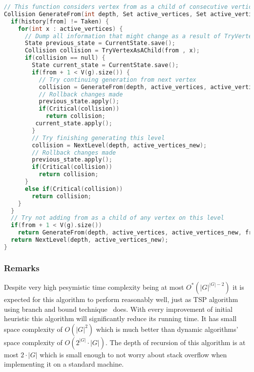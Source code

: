 \begin{lstlisting}[language=C++]
// This function considers vertex from as a child of consecutive vertices from active_vertices. At the time of calling this function, every vertex v < from has been considered on this level.
Collision GenerateFrom(int depth, Set active_vertices, Set active_vertices_new, int from) {
  if(history[from] != Taken) {
    for(int x : active_vertices) {
      // Dump all information that might change as a result of TryVertexAsAChild
      State previous_state = CurrentState.save();
      Collision collision = TryVertexAsAChild(from , x);
      if(collision == null) {
        State current_state = CurrentState.save();
        if(from + 1 < V(g).size()) {
          // Try continuing generation from next vertex
          collision = GenerateFrom(depth, active_vertices, active_vertices_new, from + 1);
          // Rollback changes made
          previous_state.apply();
          if(Critical(collision))
            return collision;
         current_state.apply();
        }
        // Try finishing generating this level
        collision = NextLevel(depth, active_vertices_new);
        // Rollback changes made
        previous_state.apply();
        if(Critical(collision))
          return collision;
      }
      else if(Critical(collision))
        return collision;
    }
  }
  // Try not adding from as a child of any vertex on this level
  if(from + 1 < V(g).size())
    return GenerateFrom(depth, active_vertices, active_vertices_new, from + 1);
  return NextLevel(depth, active_vertices_new);
}
\end{lstlisting}
\subsubsection{Remarks}
Despite very high pesymistic time complexity being at most $O^*\left(\left|G\right|^{\left|G\right|-2}\right)$ it is expected for this algorithm to perform reasonably well, just as TSP algorithm using branch and bound technique~\cite{tsp_bnb} does. With every improvement of initial heuristic this algorithm will significantly reduce its running time. It has small space complexity of $O\left(\left|G\right|^2\right)$ which is much better than dynamic algorithms' space complexity of $O\left(2^{\left|G\right|}\cdot\left|G\right|\right)$. The depth of recursion of this algorithm is at most $2\cdot\left|G\right|$ which is small enough to not worry about stack overflow when implementing it on a standard machine.
